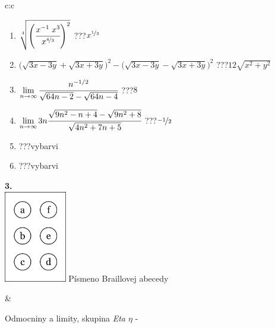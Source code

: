 \documentclass[10pt]{report}
\begin{document}
\begin{tabular}{c:c}
\begin{minipage}[c][104.5mm][t]{0.5\linewidth}
\begin{center}
\begin{minipage}{0.79\linewidth}
\begin{center}
\begin{varwidth}{\linewidth}
\begin{enumerate}
\small
\item $\sqrt[4]{\left(\cfrac{x^{-1}\;x^{3}}{x^{\nicefrac{4}{3}}}\right)^{2}}$\quad \dotfill\; ???\;\dotfill \quad $x^{\nicefrac{1}{3}}$
\item {\footnotesize{\scriptsize$\big(\sqrt{3x-3y}+\sqrt{3x+3y}\big)^2-\big(\sqrt{3x-3y}-\sqrt{3x+3y}\big)^2$}\quad \dotfill\; ???\;\dotfill \quad $12\sqrt{x^2+y^2}$}
\item $\lim\limits_{n\to\infty}\cfrac{n^{-1/2}}{\sqrt{64n-2}-\sqrt{64n-4}}$\quad \dotfill\; ???\;\dotfill \quad $8$
\item $\lim\limits_{n\to\infty}3n\cfrac{\sqrt{9n^2-n+4}-\sqrt{9n^2+8}}{\sqrt{4n^2+7n+5}}$\quad \dotfill\; ???\;\dotfill \quad $\nicefrac{-1}{2}$
\item \quad \dotfill\; ???\;\dotfill \quad vybarvi
\item \quad \dotfill\; ???\;\dotfill \quad vybarvi
\end{enumerate}
\end{varwidth}
\end{center}
\end{minipage}
\begin{minipage}{0.20\linewidth}
\begin{center}
{\Huge\bfseries 3.} \\[2mm]
\includegraphics[height=40mm]{../images/braille.png}
{\small Písmeno Braillovej abecedy}
\end{center}
\end{minipage}
\end{center}
\end{minipage}
&
\begin{minipage}[c][104.5mm][t]{0.5\linewidth}
\begin{center}
\vspace{7mm}
{\huge Odmocniny a limity, skupina \textit{Eta $\eta$} -}\\[5mm]

\end{center}
\end{minipage}
\end{tabular}
\end{document}
